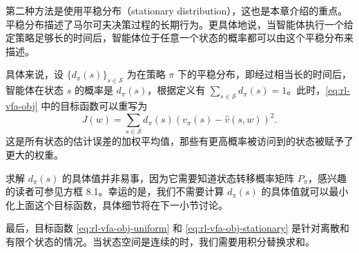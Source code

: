 第二种方法是使用平稳分布（stationary distribution），这也是本章介绍的重点。平稳分布描述了马尔可夫决策过程的长期行为。更具体地说，当智能体执行一个给定策略足够长的时间后，智能体位于任意一个状态的概率都可以由这个平稳分布来描述。

具体来说，设 $\{d_{\pi}(s)\}_{s\in \mathcal{S}}$ 为在策略 $\pi$ 下的平稳分布，即经过相当长的时间后，智能体在状态 $s$ 的概率是 $d_{\pi}(s)$，根据定义有 $\sum_{s\in \mathcal{S}}d_{\pi}(s) = 1$。此时，\cref{eq:rl-vfa-obj} 中的目标函数可以重写为
\begin{equation}
J(w) = \sum_{s \in \mathcal{S}} d_{\pi}(s) (v_{\pi}(s) - \hat{v}(s, w))^{2}.
\label{eq:rl-vfa-obj-stationary}
\end{equation}
这是所有状态的估计误差的加权平均值，那些有更高概率被访问到的状态被赋予了更大的权重。

求解 $d_{\pi}(s)$ 的具体值并非易事，因为它需要知道状态转移概率矩阵 $P_{\pi}$，感兴趣的读者可参见方框 8.1。幸运的是，我们不需要计算 $d_{\pi}(s)$ 的具体值就可以最小化上面这个目标函数，具体细节将在下一小节讨论。

最后，目标函数 \cref{eq:rl-vfa-obj-uniform} 和 \cref{eq:rl-vfa-obj-stationary} 是针对离散和有限个状态的情况。当状态空间是连续的时，我们需要用积分替换求和。

